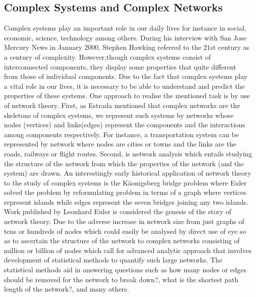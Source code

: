 \documentclass[10pt,a4paper]{article}
\begin{document}
	\subsection{Complex Systems and Complex Networks}
	Complex systems play an important role in our daily lives for instance in social, economic, science, technology among others.  During his interview with San Jose Mercury News in January 2000, Stephen Hawking referred to the $21$st century as a century of complexity. However,though complex systems consist of interconnected components, they display some properties that quite different from those of individual components.  Due to the fact that complex systems play a vital role in our lives, it is necessary to be able to understand and predict the properties of these systems. One approach to realise the mentioned task is by use of network theory. First, as Estrada \citep{estrada2015first} mentioned that complex networks are the skeletons of complex systems, we represent such systems by networks whose nodes (vertices) and links(edges) represent the components and the interactions among components respectively. For instance, a transportation system can be represented by network where nodes are cities or towns and the links are the roads, railways or flight routes.  Second, is network analysis which entails studying the structure of the network from which the properties of the network (and the system) are drawn.
	An interestingly early historical application of network theory to the study of complex systems is the K\"{a}onigsberg bridge problem where Euler \citep{euler1976solution;euler1953leonhard} solved the problem by reformulating problem in terms of a graph where vertices represent islands while edges represent the seven bridges joining any two islands. Work published by Leonhard Euler \citep{euler1976solution} is considered the genesis of the story of network theory.
	Due to the adverse increase in network size from just graphs of tens or hundreds of nodes which could easily be analysed by direct use of eye so as to ascertain the structure of the network  to complex networks consisting of million or billion of nodes which call for advanced analytic approach that involves development of statistical methods to quantify such large networks. The statistical methods aid in answering questions such as how many nodes or edges should be removed for the network to break down?, what is the shortest path length of the network?, and many others. 
	
	
\end{document}
